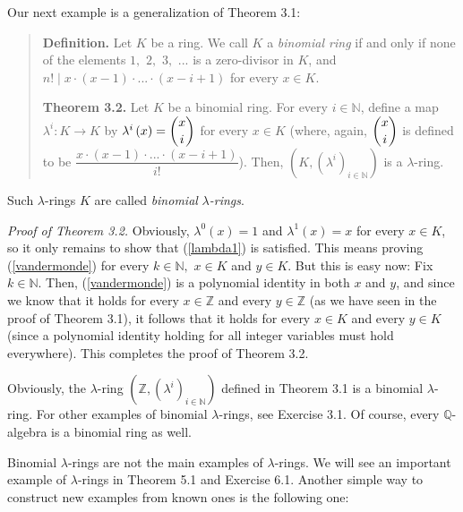 \documentclass[12pt,final,notitlepage,onecolumn,german]{article}%
\begin{document}
Our next example is a generalization of Theorem 3.1:

\begin{quote}
\textbf{Definition.} Let $K$ be a ring. We call $K$ a \textit{binomial ring}
if and only if none of the elements $1,$ $2,$ $3,$ $...$ is a zero-divisor in
$K$, and $n!\mid x\cdot\left(  x-1\right)  \cdot...\cdot\left(  x-i+1\right)
$ for every $x\in K$.

\textbf{Theorem 3.2.} Let $K$ be a binomial ring. For every $i\in\mathbb{N}$,
define a map $\lambda^{i}:K\rightarrow K$ by $\lambda^{i}\left(  x\right)
=\dbinom{x}{i}$ for every $x\in K$ (where, again, $\dbinom{x}{i}$ is defined
to be $\dfrac{x\cdot\left(  x-1\right)  \cdot...\cdot\left(  x-i+1\right)
}{i!}$). Then, $\left(  K,\left(  \lambda^{i}\right)  _{i\in\mathbb{N}%
}\right)  $ is a $\lambda$-ring.
\end{quote}

Such $\lambda$-rings $K$ are called \textit{binomial }$\lambda$\textit{-rings}.

\textit{Proof of Theorem 3.2.} Obviously, $\lambda^{0}\left(  x\right)  =1$
and $\lambda^{1}\left(  x\right)  =x$ for every $x\in K$, so it only remains
to show that (\ref{lambda1}) is satisfied. This means proving
(\ref{vandermonde}) for every $k\in\mathbb{N},$ $x\in K$ and $y\in K$. But
this is easy now: Fix $k\in\mathbb{N}$. Then, (\ref{vandermonde}) is a
polynomial identity in both $x$ and $y$, and since we know that it holds for
every $x\in\mathbb{Z}$ and every $y\in\mathbb{Z}$ (as we have seen in the
proof of Theorem 3.1), it follows that it holds for every $x\in K$ and every
$y\in K$ (since a polynomial identity holding for all integer variables must
hold everywhere). This completes the proof of Theorem 3.2.

Obviously, the $\lambda$-ring $\left(  \mathbb{Z},\left(  \lambda^{i}\right)
_{i\in\mathbb{N}}\right)  $ defined in Theorem 3.1 is a binomial $\lambda
$-ring. For other examples of binomial $\lambda$-rings, see Exercise 3.1. Of
course, every $\mathbb{Q}$-algebra is a binomial ring as well.

Binomial $\lambda$-rings are not the main examples of $\lambda$-rings. We will
see an important example of $\lambda$-rings in Theorem 5.1 and Exercise 6.1.
Another simple way to construct new examples from known ones is the following one:
\end{document}
